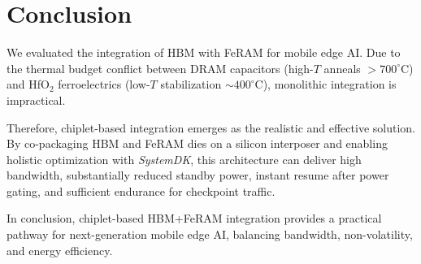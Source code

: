 \section{Conclusion}
We evaluated the integration of HBM with FeRAM for mobile edge AI. 
Due to the thermal budget conflict between DRAM capacitors (high-$T$ anneals $>700^\circ$C) 
and HfO$_2$ ferroelectrics (low-$T$ stabilization $\sim400^\circ$C), 
monolithic integration is impractical.  

Therefore, chiplet-based integration emerges as the realistic and effective solution. 
By co-packaging HBM and FeRAM dies on a silicon interposer and enabling holistic optimization with \textit{SystemDK}, 
this architecture can deliver high bandwidth, substantially reduced standby power, 
instant resume after power gating, and sufficient endurance for checkpoint traffic.  

In conclusion, chiplet-based HBM+FeRAM integration provides a practical pathway for next-generation mobile edge AI, 
balancing bandwidth, non-volatility, and energy efficiency.
